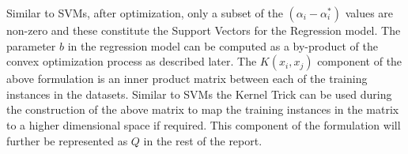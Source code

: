 \documentclass[12pt]{article}
\begin{document}
 Similar to SVMs, after optimization, only a subset of the $(\alpha_{i} - \alpha^*_{i})$ values are non-zero and these constitute the Support Vectors for the Regression model. The parameter $b$ in the regression model can be computed as a by-product of the convex optimization process as described later.
 \newline
 \newline
 The $K(x_{i}, x_{j})$ component of the above formulation is an inner product matrix between each of the training instances in the datasets\footnotemark. Similar to SVMs the Kernel Trick can be used during the construction of the above matrix to map the training instances in the matrix to a higher dimensional space if required. This component of the formulation will further be represented as $Q$ in the rest of the report.
\end{document}
